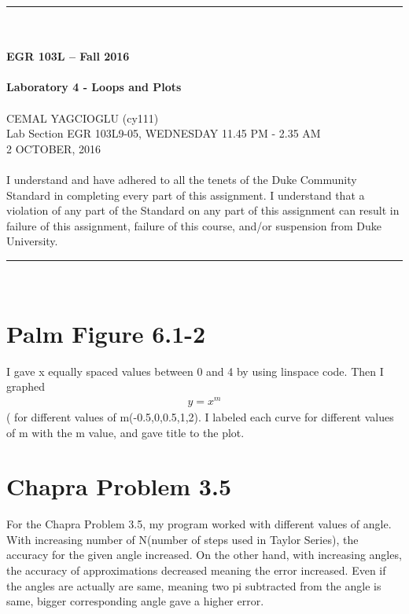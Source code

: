 \documentclass{article}
\begin{document}
\begin{center}
\rule{6.5in}{0.5mm}\\~\\
{\bf \large EGR 103L -- Fall 2016}\\~\\
{\huge \bf Laboratory 4 - Loops and Plots}\\~\\
CEMAL YAGCIOGLU (cy111)\\
Lab Section EGR 103L9-05, WEDNESDAY 11.45 PM - 2.35 AM\\
2 OCTOBER, 2016\\~\\
{\small I understand and have adhered to all the tenets of the Duke
  Community Standard in completing every part of this assignment.  I
  understand that a violation of any part of the Standard on any part
  of this assignment can result in failure of this assignment, failure
  of this course, and/or suspension from Duke University.} 
\rule{6.5in}{0.5mm}\\
\end{center}
\tableofcontents
\listoffigures
\pagebreak


\section{Palm Figure 6.1-2}
I gave x equally spaced values between 0 and 4 by using linspace code. Then I graphed \begin{align} y=x^m \end{align} (\cite[p.~265]{Palm} for different values of m(-0.5,0,0.5,1,2). I labeled each curve for different values of m with the m value, and gave title to the plot.


\section{Chapra Problem 3.5}
For the Chapra Problem 3.5, my program worked with different values of angle. With increasing number of N(number of steps used in Taylor Series), the accuracy for the given angle increased. On the other hand, with increasing angles, the accuracy of approximations decreased meaning the error increased. Even if the angles are actually are same, meaning two pi subtracted from the angle is same, bigger corresponding angle gave a higher error.
\end{document}
